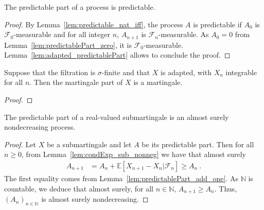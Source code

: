 \begin{lemma}\label{lem:predictable_predictablePart}
  \leanok
The predictable part of a process is predictable.
\end{lemma}

\begin{proof}\leanok
By Lemma~\ref{lem:predictable_nat_iff}, the process $A$ is predictable if $A_0$ is $\mathcal{F}_0$-measurable and for all integer $n$, $A_{n+1}$ is $\mathcal{F}_n$-measurable. As $A_0 = 0$ from Lemma~\ref{lem:predictablePart_zero}, it is $\mathcal{F}_0$-measurable. Lemma~\ref{lem:adapted_predictablePart} allows to conclude the proof.
\end{proof}


\begin{lemma}\label{lem:martingale_martingalePart}
  \mathlibok
Suppose that the filtration is $\sigma$-finite and that $X$ is adapted, with $X_n$ integrable for all $n$.
Then the martingale part of $X$ is a martingale.
\end{lemma}

\begin{proof}\leanok

\end{proof}


\begin{lemma}\label{lem:Submartingale.monotone_predictablePart}
  \leanok
The predictable part of a real-valued submartingale is an almost surely nondecreasing process.
\end{lemma}

\begin{proof}\leanok
Let $X$ be a submartingale and let $A$ be its predictable part. Then for all $n \geq 0$, from Lemma~\ref{lem:condExp_sub_nonneg} we have that almost surely
\begin{align*}
  A_{n+1} &= A_n + \mathbb{E}\left[ X_{n+1} - X_n | \mathcal{F}_n \right]
  \ge A_n
  \: .
\end{align*}
The first equality comes from Lemma~\ref{lem:predictablePart_add_one}. As $\mathbb{N}$ is countable, we deduce that almost surely, for all $n \in \mathbb{N}$, $A_{n+1} \ge A_n$.
Thus, $(A_n)_{n \in \mathbb{N}}$ is almost surely nondecreasing.
\end{proof}


